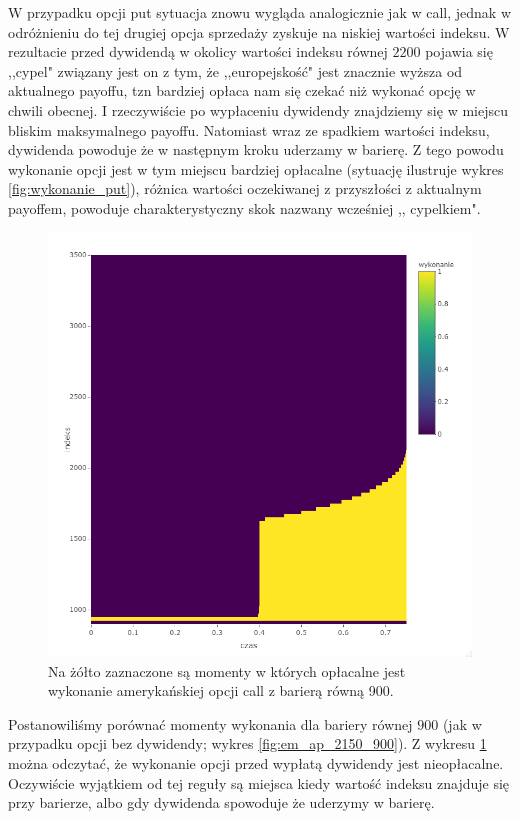 \documentclass[12pt]{article}
\begin{document}
W przypadku opcji put sytuacja znowu wygląda analogicznie jak w call, jednak w odróżnieniu do tej drugiej opcja sprzedaży zyskuje na niskiej wartości indeksu. W rezultacie przed dywidendą w okolicy wartości indeksu równej $2200$ pojawia się ,,cypel" związany jest on z tym, że ,,europejskość" jest znacznie wyższa od aktualnego payoffu, tzn bardziej opłaca nam się czekać niż wykonać opcję w chwili obecnej. I rzeczywiście po wypłaceniu dywidendy znajdziemy się w miejscu bliskim maksymalnego payoffu. Natomiast wraz ze spadkiem wartości indeksu, dywidenda powoduje że w następnym kroku uderzamy w barierę. Z tego powodu wykonanie opcji jest w tym miejscu bardziej opłacalne (sytuację ilustruje wykres \ref{fig:wykonanie_put}), różnica wartości oczekiwanej z przyszłości z aktualnym payoffem, powoduje charakterystyczny skok nazwany wcześniej ,, cypelkiem".

\begin{figure}[H]
    \centering
    \includegraphics[width=\textwidth,height=\textheight,keepaspectratio]{dividend/wykonanie_put_900.png}
    \caption{Na żółto zaznaczone są momenty w których opłacalne jest wykonanie amerykańskiej opcji call z barierą równą 900.}
    \label{fig:divi_put_EU_900}
\end{figure}
Postanowiliśmy porównać momenty wykonania dla bariery równej $900$ (jak w przypadku opcji bez dywidendy; wykres \ref{fig:em_ap_2150_900}). Z wykresu \ref{fig:divi_put_EU_900} można odczytać, że wykonanie opcji przed wypłatą dywidendy jest nieopłacalne. Oczywiście wyjątkiem od tej reguły są miejsca kiedy wartość indeksu znajduje się przy barierze, albo gdy dywidenda spowoduje że uderzymy w barierę.
\end{document}
